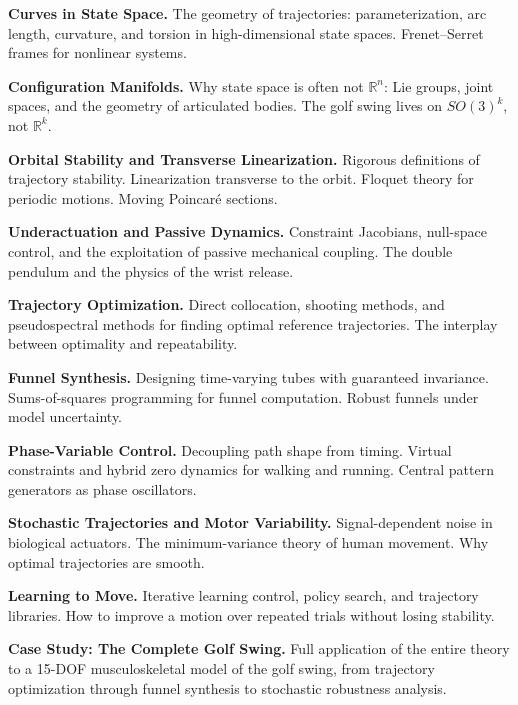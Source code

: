 \documentclass[12pt, openany]{book}
\theoremstyle{plain}
\newcommand{\Reals}{\mathbb{R}}
\begin{document}
\begin{description}[leftmargin=1.5cm, labelwidth=1.2cm, font=\bfseries\color{chapblue}]
  \item[Ch.~2] \textbf{Curves in State Space.}
    The geometry of trajectories: parameterization, arc length, curvature, and torsion
    in high-dimensional state spaces. Frenet--Serret frames for nonlinear systems.

  \item[Ch.~3] \textbf{Configuration Manifolds.}
    Why state space is often not $\Reals^n$: Lie groups, joint spaces, and the
    geometry of articulated bodies. The golf swing lives on $SO(3)^k$, not $\Reals^k$.

  \item[Ch.~4] \textbf{Orbital Stability and Transverse Linearization.}
    Rigorous definitions of trajectory stability. Linearization transverse to the
    orbit. Floquet theory for periodic motions. Moving Poincar\'e sections.

  \item[Ch.~5] \textbf{Underactuation and Passive Dynamics.}
    Constraint Jacobians, null-space control, and the exploitation of passive
    mechanical coupling. The double pendulum and the physics of the wrist release.

  \item[Ch.~6] \textbf{Trajectory Optimization.}
    Direct collocation, shooting methods, and pseudospectral methods for finding
    optimal reference trajectories. The interplay between optimality and
    repeatability.

  \item[Ch.~7] \textbf{Funnel Synthesis.}
    Designing time-varying tubes with guaranteed invariance. Sums-of-squares
    programming for funnel computation. Robust funnels under model uncertainty.

  \item[Ch.~8] \textbf{Phase-Variable Control.}
    Decoupling path shape from timing. Virtual constraints and hybrid zero dynamics
    for walking and running. Central pattern generators as phase oscillators.

  \item[Ch.~9] \textbf{Stochastic Trajectories and Motor Variability.}
    Signal-dependent noise in biological actuators. The minimum-variance theory of
    human movement. Why optimal trajectories are smooth.

  \item[Ch.~10] \textbf{Learning to Move.}
    Iterative learning control, policy search, and trajectory libraries. How to
    improve a motion over repeated trials without losing stability.

  \item[Ch.~11] \textbf{Case Study: The Complete Golf Swing.}
    Full application of the entire theory to a 15-DOF musculoskeletal model of the
    golf swing, from trajectory optimization through funnel synthesis to
    stochastic robustness analysis.
\end{description}
\end{document}
